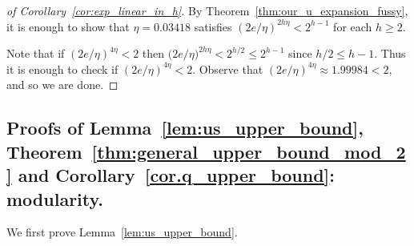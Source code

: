 \documentclass[runningheads, envcountsame, smallextended]{llncs}
\numberwithin{theorem}{section}
\numberwithin{definition}{section}
\numberwithin{lemma}{section}
\numberwithin{corollary}{section}
\numberwithin{proposition}{section}
\numberwithin{conjecture}{section}
\numberwithin{remark}{section}
\numberwithin{equation}{section}
\begin{document}
\begin{proof}[of Corollary~\ref{cor:exp_linear_in_h}]
    By Theorem~\ref{thm:our_u_expansion_fussy}, it is enough to show that $\eta=0.03418$ satisfies $(2e/\eta)^{2h\eta}<2^{h-1}$ for each $h\geq 2$. 

    Note that if $(2e/\eta)^{4\eta}<2$ then
    $\big(2e/\eta\big)^{2h\eta} < 2^{h/2} \leq 2^{h-1}$
    since $h/2\leq h-1$. Thus it is enough to check if $(2e/\eta)^{4\eta}<2$. 
	  Observe that $(2e/\eta)^{4\eta} \approx 1.99984 < 2$, and so we are done.
\end{proof}

\subsection{Proofs of Lemma~\ref{lem:us_upper_bound},
Theorem~\ref{thm:general_upper_bound_mod_2} and Corollary~\ref{cor.q_upper_bound}: modularity. 
}\label{sec:proofs_mod}

We first prove Lemma~\ref{lem:us_upper_bound}.
\end{document}
